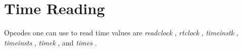 \begin{comment}
\documentclass[10pt]{article}
\usepackage{fullpage, graphicx, url}
\setlength{\parskip}{1ex}
\setlength{\parindent}{0ex}
\title{Time Reading}



\begin{tabular}{ccc}
The Alternative Csound Reference Manual & & \\
Previous &Instrument Control &Next

\end{tabular}

\end{comment}
\section{Time Reading}


  Opcodes one can use to read time values are \emph{readclock}
, \emph{rtclock}
, \emph{timeinstk}
, \emph{timeinsts}
, \emph{timek}
, and \emph{times}
. 


\begin{comment}
\begin{tabular}{lcr}
Previous &Home &Next \\
Sub-instrument Control &Up &Function Table Control

\end{tabular}



\end{comment}
